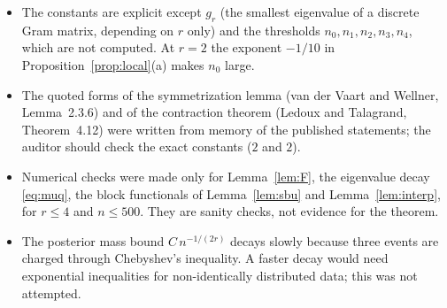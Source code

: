 \documentclass[11pt]{article}
\theoremstyle{definition}
\theoremstyle{remark}
\begin{document}
\begin{itemize}[itemsep=2pt,topsep=2pt]
\item The constants are explicit except $g_r$ (the smallest eigenvalue of a discrete Gram matrix, depending on $r$ only) and the thresholds $n_0,n_1,n_2,n_3,n_4$, which are not computed. At $r=2$ the exponent $-1/10$ in Proposition~\ref{prop:local}(a) makes $n_0$ large.
\item The quoted forms of the symmetrization lemma (van der Vaart and Wellner, Lemma~2.3.6) and of the contraction theorem (Ledoux and Talagrand, Theorem~4.12) were written from memory of the published statements; the auditor should check the exact constants ($2$ and $2$).
\item Numerical checks were made only for Lemma~\ref{lem:F}, the eigenvalue decay \eqref{eq:muq}, the block functionals of Lemma~\ref{lem:sbu} and Lemma~\ref{lem:interp}, for $r\le4$ and $n\le500$. They are sanity checks, not evidence for the theorem.
\item The posterior mass bound $C\,n^{-1/(2r)}$ decays slowly because three events are charged through Chebyshev's inequality. A faster decay would need exponential inequalities for non-identically distributed data; this was not attempted.
\end{itemize}
\end{document}
